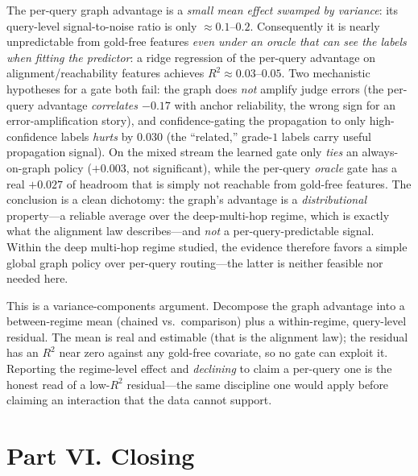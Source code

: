 \documentclass[11pt]{article}
\theoremstyle{plain}
\theoremstyle{definition}
\theoremstyle{remark}
\begin{document}
The per-query graph advantage is a \emph{small mean effect swamped by variance}: its query-level signal-to-noise
ratio is only $\approx0.1$--$0.2$. Consequently it is nearly unpredictable from gold-free features \emph{even under
an oracle that can see the labels when fitting the predictor}: a ridge regression of the per-query advantage on
alignment/reachability features achieves $R^2\approx0.03$--$0.05$. Two mechanistic hypotheses for a gate both fail:
the graph does \emph{not} amplify judge errors (the per-query advantage \emph{correlates $-0.17$} with anchor
reliability, the wrong sign for an error-amplification story), and confidence-gating the propagation to only
high-confidence labels \emph{hurts} by $0.030$ (the ``related,'' grade-$1$ labels carry useful propagation signal).
On the mixed stream the learned gate only \emph{ties} an always-on-graph policy ($+0.003$, not significant), while
the per-query \emph{oracle} gate has a real $+0.027$ of headroom that is simply not reachable from gold-free
features. The conclusion is a clean dichotomy: the graph's advantage is a \emph{distributional} property---a reliable
average over the deep-multi-hop regime, which is exactly what the alignment law describes---and \emph{not} a
per-query-predictable signal. Within the deep multi-hop regime studied, the evidence therefore favors a simple
global graph policy over per-query routing---the latter is neither feasible nor needed here.

\begin{stats}
This is a variance-components argument. Decompose the graph advantage into a between-regime mean (chained vs.\
comparison) plus a within-regime, query-level residual. The mean is real and estimable (that is the alignment law);
the residual has an $R^2$ near zero against any gold-free covariate, so no gate can exploit it. Reporting the
regime-level effect and \emph{declining} to claim a per-query one is the honest read of a low-$R^2$ residual---the
same discipline one would apply before claiming an interaction that the data cannot support.
\end{stats}

\part*{Part VI. Closing}
\end{document}
